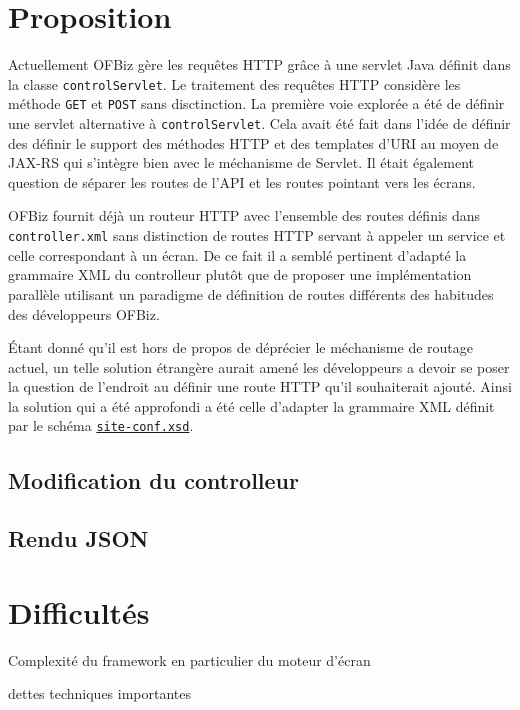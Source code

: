 \documentclass[a4paper, 11pt]{report}
\begin{document}
\section{Proposition}

Actuellement OFBiz gère les requêtes HTTP grâce à une servlet Java
\cite{Chan2017servlet} définit dans la classe \verb=controlServlet=.
Le traitement des requêtes HTTP considère les méthode \verb=GET= et
\verb=POST= sans disctinction.  La première voie explorée a été de
définir une servlet alternative à \verb=controlServlet=.  Cela avait
été fait dans l'idée de définir des définir le support des méthodes
HTTP et des templates d'URI au moyen de JAX-RS qui s'intègre bien avec
le méchanisme de Servlet.  Il était également question de séparer les
routes de l'API et les routes pointant vers les écrans.

OFBiz fournit déjà un routeur HTTP avec l'ensemble des routes définis
dans \verb=controller.xml= sans distinction de routes HTTP servant à
appeler un service et celle correspondant à un écran.  De ce fait il a
semblé pertinent d'adapté la grammaire XML du controlleur plutôt que
de proposer une implémentation parallèle utilisant un paradigme de
définition de routes différents des habitudes des développeurs OFBiz.

Étant donné qu'il est hors de propos de déprécier le méchanisme de
routage actuel, un telle solution étrangère aurait amené les
développeurs a devoir se poser la question de l'endroit au définir une
route HTTP qu'il souhaiterait ajouté.  Ainsi la solution qui a été
approfondi a été celle d'adapter la grammaire XML définit par le
schéma
\href{http://ofbiz.apache.org/dtds/site-conf.xsd}{\nolinkurl{site-conf.xsd}}.

\subsection{Modification du controlleur}

\subsection{Rendu JSON}

\section{Difficultés}

Complexité du framework en particulier du moteur d'écran

dettes techniques importantes
\end{document}
